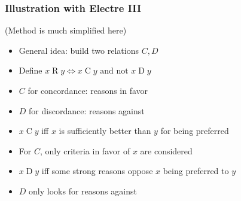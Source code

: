 \documentclass[french,english]{beamer}
\begin{document}
\begin{frame}
	\frametitle{Illustration with Electre III}
	(Method is much simplified here)
	\begin{itemize}
		\item General idea: build two relations $C, D$
		\item Define $x {\mathrel{R}} y ⇔ x {\mathrel{C}} y \text{ and not } x {\mathrel{D}} y$
		\item $C$ for concordance: reasons in favor
		\item $D$ for discordance: reasons against
		\item $x \mathrel{C} y$ iff $x$ is sufficiently better than $y$ for being preferred
		\item For $C$, only criteria in favor of $x$ are considered
		\item $x \mathrel{D} y$ iff some strong reasons oppose $x$ being preferred to $y$
		\item $D$ only looks for reasons against
	\end{itemize}
\end{frame}
\end{document}
